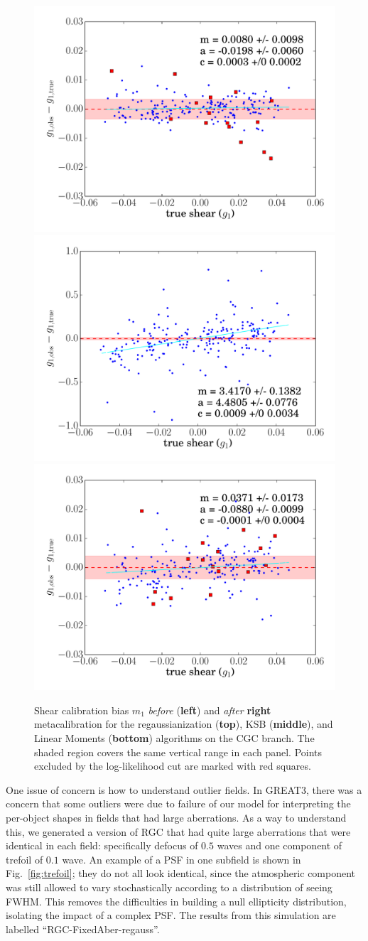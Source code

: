 \documentclass[iop]{emulateapj}
\begin{document}
\begin{figure}[t]
\begin{center}
\includegraphics[width=0.46\linewidth]{m1-ksb-opt-shear_plots.pdf}\\
\includegraphics[width=0.46\linewidth]{m1-no_corrections-moments.pdf}
\includegraphics[width=0.46\linewidth]{m1-moments-opt-shear_plots.pdf}
\end{center}
\caption{Shear calibration bias $m_1$ {\it before} ({\bf left}) and
  {\it after} {\bf right} metacalibration for the regaussianization
  ({\bf top}), KSB ({\bf middle}), and Linear Moments ({\bf bottom})
  algorithms on the CGC branch. The shaded region covers the same
  vertical range in each panel.  Points excluded by the log-likelihood
  cut are marked with red squares.}
\label{fig:m_comparison}
\end{figure}

One issue of concern is how to understand outlier fields.  In GREAT3,
there was a concern that some outliers were due to failure of our
model for interpreting the per-object shapes in fields that had large
aberrations. 
As a way to understand this, we generated a version of RGC that had
quite large aberrations that were identical in each field:
specifically defocus of $0.5$ waves and one component of trefoil of
$0.1$ wave.  An example of a PSF in one subfield is shown in
Fig.~\ref{fig:trefoil}; they do not all look identical, since the
atmospheric component was still allowed to vary stochastically
according to a distribution of seeing FWHM. This removes the difficulties
in building a null ellipticity distribution, isolating the impact of a
complex PSF. The results from this simulation are labelled
``RGC-FixedAber-regauss''.
\end{document}
